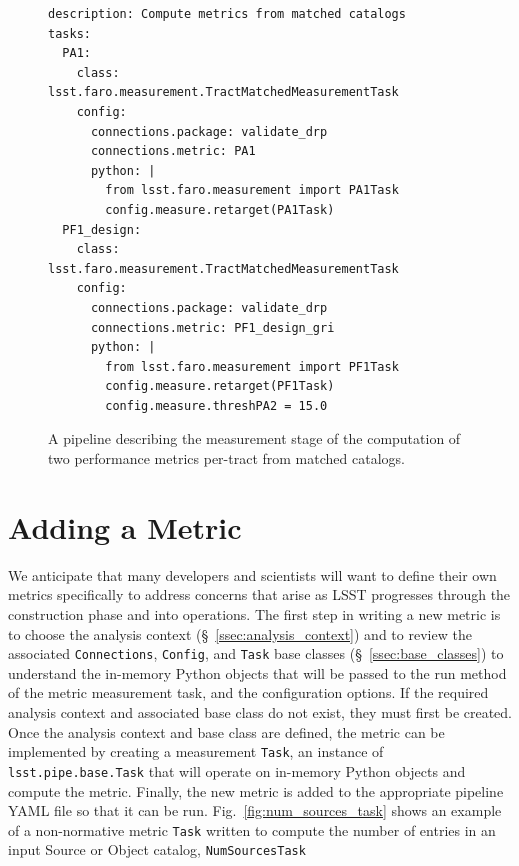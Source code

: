 \begin{figure}[ht]
  \begin{center}
  \lstset{language=YAML}
  \begin{lstlisting}
description: Compute metrics from matched catalogs
tasks:
  PA1:
    class: lsst.faro.measurement.TractMatchedMeasurementTask
    config:
      connections.package: validate_drp
      connections.metric: PA1
      python: |
        from lsst.faro.measurement import PA1Task
        config.measure.retarget(PA1Task)
  PF1_design:
    class: lsst.faro.measurement.TractMatchedMeasurementTask
    config:
      connections.package: validate_drp
      connections.metric: PF1_design_gri
      python: |
        from lsst.faro.measurement import PF1Task
        config.measure.retarget(PF1Task)
        config.measure.threshPA2 = 15.0
    \end{lstlisting}
    \end{center}
  \caption{\label{fig:faro_pipeline} 
  A \faro pipeline describing the measurement stage of the computation of two performance metrics per-tract from matched catalogs.}
\end{figure}

\section{Adding a  Metric} \label{sec:add}

We anticipate that many developers and scientists will want to define their own metrics specifically to address concerns that arise as LSST progresses through the construction phase and into operations.
The first step in writing a new metric is to choose the analysis context (\S~\ref{ssec:analysis_context}) and to review the associated \texttt{Connections}, \texttt{Config}, and \texttt{Task} base classes (\S~\ref{ssec:base_classes}) to understand the in-memory Python objects that will be passed to the run method of the metric measurement task, and the configuration options.
If the required analysis context and associated base class do not exist, they must first be created. 
Once the analysis context and base class are defined, the metric can be implemented by creating a measurement \texttt{Task}, an instance of \texttt{lsst.pipe.base.Task} that will operate on in-memory Python objects and compute the metric. 
Finally, the new metric is added to the appropriate pipeline YAML file so that it can be run.
Fig.~\ref{fig:num_sources_task} shows an example of a non-normative metric \texttt{Task} written to compute the number of entries in an input Source or Object catalog, \texttt{NumSourcesTask}


